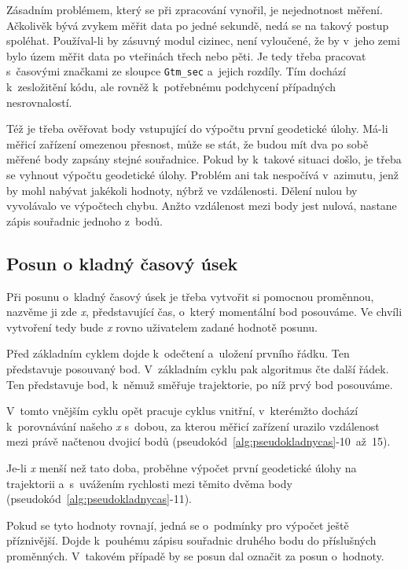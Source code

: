 Zásadním problémem, který se při zpracování vynořil, je nejednotnost měření.
Ačkolivěk bývá zvykem měřit data po jedné sekundě, nedá se na takový postup spoléhat.
Používal-li by zásuvný modul cizinec, není vyloučené, že by v~jeho zemi bylo územ měřit
data po vteřinách třech nebo pěti. Je tedy třeba pracovat s~časovými značkami ze sloupce
{\tt Gtm\_sec} a~jejich rozdíly. Tím dochází k~zesložitění kódu, ale rovněž k~potřebnému
podchycení případných nesrovnalostí. 

Též je třeba ověřovat body vstupující do výpočtu první geodetické úlohy. Má-li měřicí zařízení
omezenou přesnost, může se stát, že budou mít dva po sobě měřené body zapsány stejné souřadnice.
Pokud by k~takové situaci došlo, je třeba se vyhnout výpočtu geodetické úlohy. Problém ani
tak nespočívá v~azimutu, jenž by mohl nabývat jakékoli hodnoty, nýbrž ve vzdálenosti.
Dělení nulou by vyvolávalo ve výpočtech chybu. Anžto vzdálenost mezi body jest nulová,
nastane zápis souřadnic jednoho z~bodů. 

\subsection{Posun o kladný časový úsek}
\label{kladnycas}

Při posunu o~kladný časový úsek je třeba vytvořit si pomocnou proměnnou, nazvěme ji zde \textit{x},
představující čas, o~který momentální bod posouváme. Ve chvíli vytvoření tedy bude \textit{x}
rovno uživatelem zadané hodnotě posunu. 

Před základním cyklem dojde k~odečtení a~uložení prvního řádku. Ten představuje posouvaný bod.
V~základním cyklu pak algoritmus čte další řádek. Ten představuje bod, k~němuž směřuje
trajektorie, po níž prvý bod posouváme. 

V~tomto vnějším cyklu opět pracuje cyklus vnitřní, v~kterémžto dochází k~porov\-ná\-vá\-ní našeho
\textit{x} s~dobou, za kterou měřicí zařízení urazilo vzdálenost mezi právě načtenou dvojicí bodů
(pseudokód~\ref{alg:pseudokladnycas}-10~až~15). 

Je-li \textit{x} menší než tato doba, proběhne výpočet první geodetické úlohy na trajektorii
a~s~uvážením rychlosti mezi těmito dvěma body (pseudokód~\ref{alg:pseudokladnycas}-11). 

Pokud se tyto hodnoty rovnají, jedná se o~podmínky pro výpočet ještě příznivější. Dojde k~pouhému
zápisu souřadnic druhého bodu do příslušných proměnných. V~ta\-ko\-vém
případě by se posun dal označit za posun o~hodnoty. 

